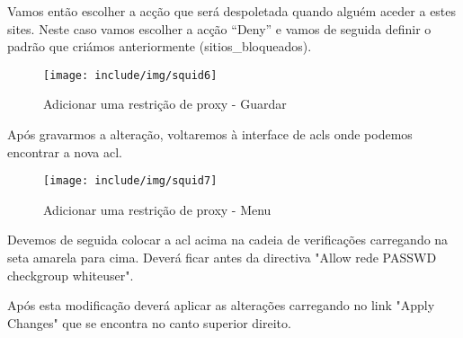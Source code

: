 Vamos então escolher a acção que será despoletada quando alguém aceder a estes sites. Neste caso vamos escolher a acção ``Deny'' e vamos de seguida
definir o padrão que criámos anteriormente (sitios\_bloqueados).

\begin{figure}[H]
    \begin{center}
        \texttt{[image: include/img/squid6]}
    \end{center}
    \caption{Adicionar uma restrição de proxy - Guardar}
    \label{fig:SQUID6}
\end{figure}


Após gravarmos a alteração, voltaremos à interface de acls onde podemos encontrar a nova acl.

\begin{figure}[H]
    \begin{center}
        \texttt{[image: include/img/squid7]}
    \end{center}
    \caption{Adicionar uma restrição de proxy - Menu}
    \label{fig:SQUID7}
\end{figure}


Devemos de seguida colocar a acl acima na cadeia de verificações carregando na seta amarela para cima. Deverá ficar antes da directiva "Allow 	rede PASSWD checkgroup whiteuser".

Após esta modificação deverá aplicar as alterações carregando no link "Apply Changes" que se encontra no canto superior direito.
